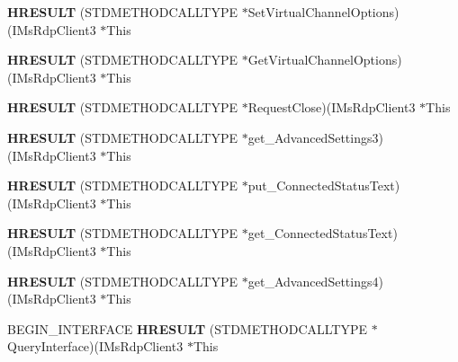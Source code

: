 \begin{DoxyCompactItemize}
{\bfseries H\+R\+E\+S\+U\+LT} (S\+T\+D\+M\+E\+T\+H\+O\+D\+C\+A\+L\+L\+T\+Y\+PE $\ast$Set\+Virtual\+Channel\+Options)(I\+Ms\+Rdp\+Client3 $\ast$This
\item 
\mbox{\label{struct_i_ms_rdp_client3_vtbl_a25a699f2021c4555de609688e593d69f}} 
{\bfseries H\+R\+E\+S\+U\+LT} (S\+T\+D\+M\+E\+T\+H\+O\+D\+C\+A\+L\+L\+T\+Y\+PE $\ast$Get\+Virtual\+Channel\+Options)(I\+Ms\+Rdp\+Client3 $\ast$This
\item 
\mbox{\label{struct_i_ms_rdp_client3_vtbl_ad5160d71b521f2ad7f7e422e1659b30d}} 
{\bfseries H\+R\+E\+S\+U\+LT} (S\+T\+D\+M\+E\+T\+H\+O\+D\+C\+A\+L\+L\+T\+Y\+PE $\ast$Request\+Close)(I\+Ms\+Rdp\+Client3 $\ast$This
\item 
\mbox{\label{struct_i_ms_rdp_client3_vtbl_a358d2b997d4ec69e8cbbc7741b56af2f}} 
{\bfseries H\+R\+E\+S\+U\+LT} (S\+T\+D\+M\+E\+T\+H\+O\+D\+C\+A\+L\+L\+T\+Y\+PE $\ast$get\+\_\+\+Advanced\+Settings3)(I\+Ms\+Rdp\+Client3 $\ast$This
\item 
\mbox{\label{struct_i_ms_rdp_client3_vtbl_a6ab8a34ad0197d246ea8e552001e0f35}} 
{\bfseries H\+R\+E\+S\+U\+LT} (S\+T\+D\+M\+E\+T\+H\+O\+D\+C\+A\+L\+L\+T\+Y\+PE $\ast$put\+\_\+\+Connected\+Status\+Text)(I\+Ms\+Rdp\+Client3 $\ast$This
\item 
\mbox{\label{struct_i_ms_rdp_client3_vtbl_a7757d54de6bc48c044c74e3d46f14c88}} 
{\bfseries H\+R\+E\+S\+U\+LT} (S\+T\+D\+M\+E\+T\+H\+O\+D\+C\+A\+L\+L\+T\+Y\+PE $\ast$get\+\_\+\+Connected\+Status\+Text)(I\+Ms\+Rdp\+Client3 $\ast$This
\item 
\mbox{\label{struct_i_ms_rdp_client3_vtbl_ad5d95cc06a18cefa204be7029cbff52e}} 
{\bfseries H\+R\+E\+S\+U\+LT} (S\+T\+D\+M\+E\+T\+H\+O\+D\+C\+A\+L\+L\+T\+Y\+PE $\ast$get\+\_\+\+Advanced\+Settings4)(I\+Ms\+Rdp\+Client3 $\ast$This
\item 
\mbox{\label{struct_i_ms_rdp_client3_vtbl_aa7e99530e202a9b1d84ce128e9c74175}} 
B\+E\+G\+I\+N\+\_\+\+I\+N\+T\+E\+R\+F\+A\+CE {\bfseries H\+R\+E\+S\+U\+LT} (S\+T\+D\+M\+E\+T\+H\+O\+D\+C\+A\+L\+L\+T\+Y\+PE $\ast$Query\+Interface)(I\+Ms\+Rdp\+Client3 $\ast$This

\end{DoxyCompactItemize}
